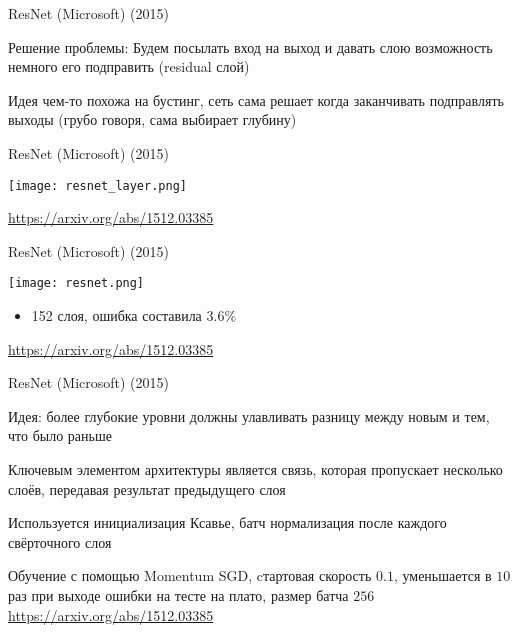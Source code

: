 \documentclass[notes,12pt, aspectratio=169]{beamer}
\newenvironment{wideitemize}{\itemize\addtolength{\itemsep}{10pt}}{\enditemize}
\begin{document}
\begin{frame}{ResNet (Microsoft) (2015)}
\begin{wideitemize}
	\item \alert{Решение проблемы:} Будем посылать вход на выход и давать слою возможность немного его подправить (residual слой)
	\item Идея чем-то похожа на бустинг, сеть сама решает когда заканчивать подправлять выходы (грубо говоря, сама выбирает глубину)
\end{wideitemize}
\end{frame}


\begin{frame}{ResNet (Microsoft) (2015)}
\begin{center}
	\texttt{[image: resnet\_layer.png]}
\end{center}
\vfill %
\footnotesize
\color{blue} \url{https://arxiv.org/abs/1512.03385}
\end{frame}


\begin{frame}{ResNet (Microsoft) (2015)}
\begin{center}
	\texttt{[image: resnet.png]}
\end{center}
\begin{itemize}
	\item 152 слоя, ошибка составила $3.6\%$
\end{itemize}
\vfill %
\footnotesize
\color{blue} \url{https://arxiv.org/abs/1512.03385}
\end{frame}


\begin{frame}{ResNet (Microsoft) (2015)}
\begin{wideitemize}
	\item \alert{Идея:} более глубокие уровни должны улавливать разницу между новым и тем, что было раньше 
	
	\item Ключевым элементом архитектуры является связь, которая пропускает несколько слоёв, передавая результат предыдущего слоя
	
	\item Используется инициализация Ксавье, батч нормализация после каждого свёрточного слоя
	
	\item Обучение с помощью Momentum SGD, cтартовая скорость $0.1$, уменьшается в $10$ раз при выходе ошибки на тесте на плато, размер батча $256$
\end{wideitemize}
\vfill %
\footnotesize
\color{blue} \url{https://arxiv.org/abs/1512.03385}
\end{frame}
\end{document}
